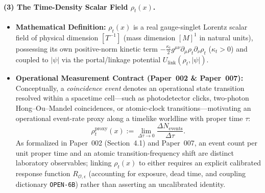 \paragraph{(3) The Time-Density Scalar Field $\rho_t(x)$.}
\begin{itemize}
  \item \textbf{Mathematical Definition:} $\rho_t(x)$ is a real gauge-singlet Lorentz scalar field of physical dimension $[T^{-1}]$ (mass dimension $[M]^1$ in natural units), possessing its own positive-norm kinetic term $-\frac{\kappa_t}{2}g^{\mu\nu}\partial_\mu\rho_t\partial_\nu\rho_t$ ($\kappa_t > 0$) and coupled to $|\psi|$ via the portal/linkage potential $U_{\mathrm{link}}(\rho_t, |\psi|)$.
  \item \textbf{Operational Measurement Contract (Paper~002 \& Paper~007):} Conceptually, a \emph{coincidence event} denotes an operational state transition resolved within a spacetime cell---such as photodetector clicks, two-photon Hong--Ou--Mandel coincidences, or atomic-clock transitions---motivating an operational event-rate proxy along a timelike worldline with proper time $\tau$:
  \begin{equation}
  \rho_t^{\mathrm{proxy}}(x) := \lim_{\Delta\tau \to 0} \frac{\Delta N_{\mathrm{events}}}{\Delta\tau}.
  \label{eq:def_rhot_operational}
  \end{equation}
  As formalized in Paper~002 (Section~4.1) and Paper~007, an event count per unit proper time and an atomic transition-frequency shift are distinct laboratory observables; linking $\rho_t(x)$ to either requires an explicit calibrated response function $R_{\mathcal{O},\epsilon}$ (accounting for exposure, dead time, and coupling dictionary \texttt{OPEN-6B}) rather than asserting an uncalibrated identity.
\end{itemize}


